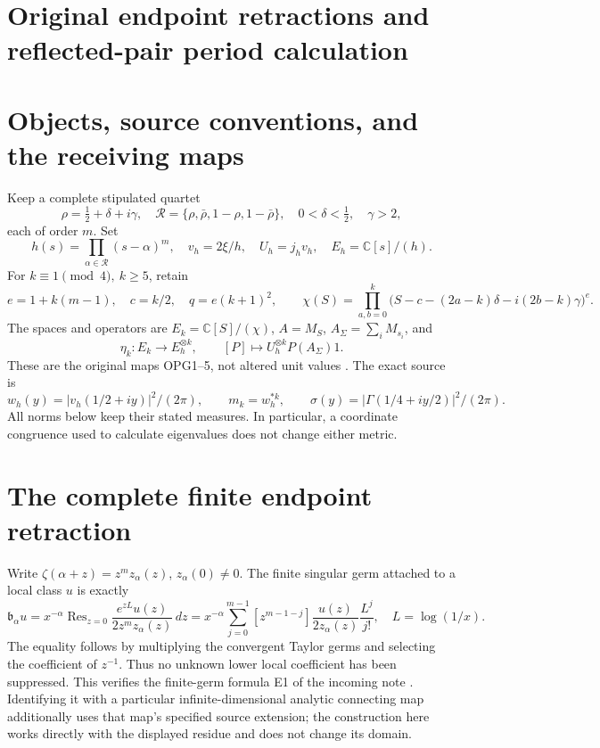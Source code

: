 \documentclass[11pt,a4paper]{article}
\begin{document}
\clearpage
\begingroup
\def\Gram{\operatorname{Gram}}
\def\Res{\operatorname{Res}}
\def\im{\operatorname{im}}
\def\cond{\operatorname{cond}}

\setcounter{equation}{0}
\renewcommand{\theequation}{ET.\arabic{equation}}
\section*{Original endpoint retractions and reflected-pair period calculation}



\section{Objects, source conventions, and the receiving maps}
Keep a complete stipulated quartet
\[
 \rho=\tfrac12+\delta+i\gamma,\quad
 \mathcal R=\{\rho,\bar\rho,1-\rho,1-\bar\rho\},\quad
 0<\delta<\tfrac12,\quad\gamma>2,
\]
each of order \(m\). Set
\[
 h(s)=\prod_{\alpha\in\mathcal R}(s-\alpha)^m,\quad
 v_h=2\xi/h,\quad U_h=j_hv_h,\quad
 E_h=\mathbb C[s]/(h).
\]
For \(k\equiv1\pmod4,\ k\ge5\), retain
\[
 e=1+k(m-1),\quad c=k/2,\quad q=e(k+1)^2,\qquad
 \chi(S)=\prod_{a,b=0}^k
 \bigl(S-c-(2a-k)\delta-i(2b-k)\gamma\bigr)^e.
\]
The spaces and operators are \(E_k=\mathbb C[S]/(\chi)\),
\(A=M_S\), \(A_\Sigma=\sum_iM_{s_i}\), and
\[
 \eta_k:E_k\longrightarrow E_h^{\otimes k},\qquad
 [P]\longmapsto U_h^{\otimes k}P(A_\Sigma)1.                 \tag{ET1}
\]
These are the original maps OPG1--5, not altered unit values
\cite[OPG1--5]{et:Current}. The exact source is
\[
 w_h(y)=|v_h(1/2+iy)|^2/(2\pi),\qquad m_k=w_h^{*k},\qquad
 \sigma(y)=|\Gamma(1/4+iy/2)|^2/(2\pi).
                                                               \tag{ET2}
\]
All norms below keep their stated measures. In particular, a coordinate
congruence used to calculate eigenvalues does not change either metric.

\section{The complete finite endpoint retraction}
Write \(\zeta(\alpha+z)=z^m z_\alpha(z)\), \(z_\alpha(0)\ne0\).
The finite singular germ attached to a local class \(u\) is exactly
\[
 \mathfrak b_\alpha u
 =x^{-\alpha}\Res_{z=0}
       \frac{e^{zL}u(z)}{2z^mz_\alpha(z)}\,dz
 =x^{-\alpha}\sum_{j=0}^{m-1}
 [z^{m-1-j}]\frac{u(z)}{2z_\alpha(z)}\frac{L^j}{j!},
 \quad L=\log(1/x).                                    \tag{ET3}
\]
The equality follows by multiplying the convergent Taylor germs and
selecting the coefficient of \(z^{-1}\). Thus no unknown lower local
coefficient has been suppressed. This verifies the finite-germ formula
E1 of the incoming note \cite[E1]{et:Incoming}. Identifying it with a
particular infinite-dimensional analytic connecting map additionally
uses that map's specified source extension; the construction here works
directly with the displayed residue and does not change its domain.
\end{document}
